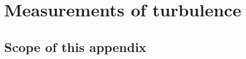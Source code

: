 \documentclass[12pt,twoside,english]{article}\usepackage[]{graphicx}\usepackage[]{color}
\let\stdsection\section
\renewcommand{\section}{\newpage\stdsection}
\begin{document}
% 

% 
% 
% 
% 
% 
% 







\section{Measurements of turbulence\label{sec:turbulence}}

\subsection{Scope of this appendix}
\end{document}
